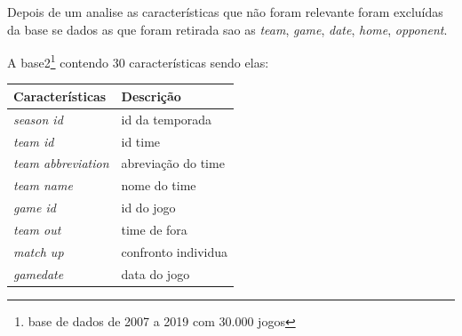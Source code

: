 Depois de um analise as características que não foram relevante foram excluídas da base se dados as que foram retirada sao as \textit{team}, \textit{game}, \textit{date}, \textit{home}, \textit{opponent}.

A base2\footnote{base de dados de 2007 a 2019 com 30.000 jogos} contendo 30 características sendo elas:

\begin{table}[htbp]
	\begin{longtable}{|l|l|}
		\hline
		Características                        & Descrição                                                                                                                                         \\ \hline
		\textit{season id}                     & id da temporada                                                                                                                                   \\ \hline
		\textit{team id}                       & id time                                                                                                                                           \\ \hline
		\textit{team abbreviation}             & abreviação do time                                                                                                                                \\ \hline
		\textit{team name}                     & nome do time                                                                                                                                      \\ \hline
		\textit{game id}                       & id do jogo                                                                                                                                        \\ \hline
		\textit{team out}                      & time de fora                                                                                                                                      \\ \hline
		\textit{match up}                      & confronto individua                                                                                                                               \\ \hline
		\textit{gamedate}                      & data do jogo                                                                                                                                      \\ \hline

\end{longtable}
\end{table}

